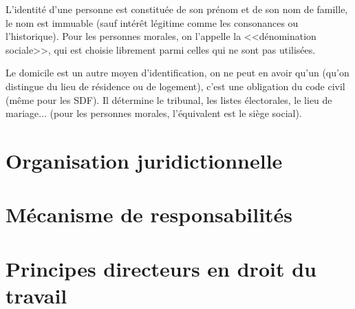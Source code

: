 \documentclass[10pt,a4paper]{article}
\begin{document}
L'identité d'une personne est constituée de son prénom et de son nom de famille, le nom est immuable (sauf intérêt légitime comme les consonances ou l'historique). Pour les personnes morales, on l'appelle la <<dénomination sociale>>, qui est choisie librement parmi celles qui ne sont pas utilisées.

Le domicile est un autre moyen d'identification, on ne peut en avoir qu'un (qu'on distingue du lieu de résidence ou de logement), c'est une obligation du code civil (même pour les SDF). Il détermine le tribunal, les listes électorales, le lieu de mariage... (pour les personnes morales, l'équivalent est le siège social).

\part{Organisation juridictionnelle}

\part{Mécanisme de responsabilités}

\part{Principes directeurs en droit du travail}
\end{document}
